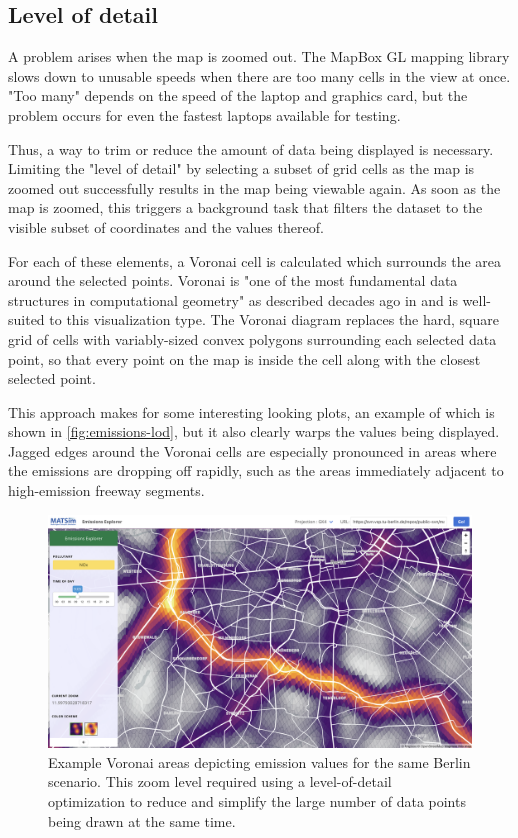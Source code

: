 \hypertarget{server-experiments-emissions-lod}{%
\subsection{Level of detail}
\label{server-experiments-emissions-lod}}

A problem arises when the map is zoomed out. The MapBox GL mapping library slows down to unusable speeds when there are too many cells in the view at once. "Too many" depends on the speed of the laptop and graphics card, but the problem occurs for even the fastest laptops available for testing.

Thus, a way to trim or reduce the amount of data being displayed is necessary. Limiting the "level of detail" by selecting a subset of grid cells as the map is zoomed out successfully results in the map being viewable again. As soon as the map is zoomed, this triggers a background task that filters the dataset to the visible subset of coordinates and the values thereof.

For each of these elements, a Voronai cell is calculated which surrounds the area around the selected points. Voronai is "one of the most fundamental data structures in computational geometry" as described decades ago in \cite{aurenhammer1991voronoi} and is well-suited to this visualization type. The Voronai diagram replaces the hard, square grid of cells with variably-sized convex polygons surrounding each selected data point, so that every point on the map is inside the cell along with the closest selected point.

This approach makes for some interesting looking plots, an example of which is shown in \autoref{fig:emissions-lod}, but it also clearly warps the values being displayed. Jagged edges around the Voronai cells are especially pronounced in areas where the emissions are dropping off rapidly, such as the areas immediately adjacent to high-emission freeway segments.

\begin{figure}[!ht]
  \includegraphics[width=\textwidth]{chapters/12-server-experiments/images/emissions-lod.png}
  \caption[Example Voronai areas depicting emission values for a Berlin scenario]{Example Voronai areas depicting emission values for the same Berlin scenario. This zoom level required using a level-of-detail optimization to reduce and simplify the large number of data points being drawn at the same time.}
  \label{fig:emissions-lod}
\end{figure}

